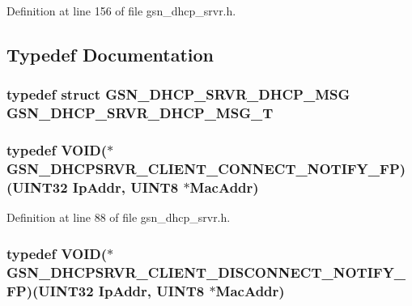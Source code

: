 Definition at line 156 of file gsn\_\-dhcp\_\-srvr.h.



\subsection{Typedef Documentation}
\hypertarget{a00482_aeaa3dc7848019559e3dae3a916ff5608}{
\subsubsection[{GSN\_\-DHCP\_\-SRVR\_\-DHCP\_\-MSG\_\-T}]{\setlength{\rightskip}{0pt plus 5cm}typedef struct {\bf GSN\_\-DHCP\_\-SRVR\_\-DHCP\_\-MSG} {\bf GSN\_\-DHCP\_\-SRVR\_\-DHCP\_\-MSG\_\-T}}}
\label{a00482_aeaa3dc7848019559e3dae3a916ff5608}
\hypertarget{a00482_a4e4c9cdf544b20379a6322b6f2466dd2}{
\subsubsection[{GSN\_\-DHCPSRVR\_\-CLIENT\_\-CONNECT\_\-NOTIFY\_\-FP}]{\setlength{\rightskip}{0pt plus 5cm}typedef VOID($\ast$ {\bf GSN\_\-DHCPSRVR\_\-CLIENT\_\-CONNECT\_\-NOTIFY\_\-FP})({\bf UINT32} IpAddr, {\bf UINT8} $\ast$MacAddr)}}
\label{a00482_a4e4c9cdf544b20379a6322b6f2466dd2}


Definition at line 88 of file gsn\_\-dhcp\_\-srvr.h.

\hypertarget{a00482_a05462468438cc4b6c8ec15d1a0cdecb6}{
\subsubsection[{GSN\_\-DHCPSRVR\_\-CLIENT\_\-DISCONNECT\_\-NOTIFY\_\-FP}]{\setlength{\rightskip}{0pt plus 5cm}typedef VOID($\ast$ {\bf GSN\_\-DHCPSRVR\_\-CLIENT\_\-DISCONNECT\_\-NOTIFY\_\-FP})({\bf UINT32} IpAddr, {\bf UINT8} $\ast$MacAddr)}}
\label{a00482_a05462468438cc4b6c8ec15d1a0cdecb6}


